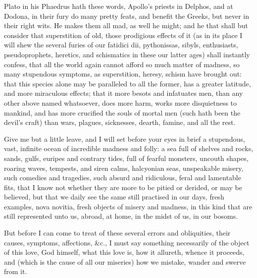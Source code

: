 {Plato in his Phaedrus hath these words, Apollo's priests in
Delphos, and at Dodona, in their fury do many pretty feats, and benefit
the Greeks, but never in their right wits. He makes them all mad, as
well he might; and he that shall but consider that superstition of old,
those prodigious effects of it (as in its place I will shew the several
furies of our fatidici dii, pythonissas, sibyls, enthusiasts,
pseudoprophets, heretics, and schismatics in these our latter ages)
shall instantly confess, that all the world again cannot afford so much
matter of madness, so many stupendous symptoms, as superstition,
heresy, schism have brought out: that this species alone may be
paralleled to all the former, has a greater latitude, and more
miraculous effects; that it more besots and infatuates men, than any
other above named whatsoever, does more harm, works more disquietness
to mankind, and has more crucified the souls of mortal men (such hath
been the devil's craft) than wars, plagues, sicknesses, dearth, famine,
and all the rest.

Give me but a little leave, and I will set before your eyes in brief a
stupendous, vast, infinite ocean of incredible madness and folly: a sea
full of shelves and rocks, sands, gulfs, euripes and contrary tides,
full of fearful monsters, uncouth shapes, roaring waves, tempests, and
siren calms, halcyonian seas, unspeakable misery, such comedies and
tragedies, such absurd and ridiculous, feral and lamentable fits, that
I know not whether they are more to be pitied or derided, or may be
believed, but that we daily see the same still practised in our days,
fresh examples, nova novitia, fresh objects of misery and madness, in
this kind that are still represented unto us, abroad, at home, in the
midst of us, in our bosoms.

But before I can come to treat of these several errors and obliquities,
their causes, symptoms, affections, \&c., I must say something
necessarily of the object of this love, God himself, what this love is,
how it allureth, whence it proceeds, and (which is the cause of all our
miseries) how we mistake, wander and swerve from it.

}
